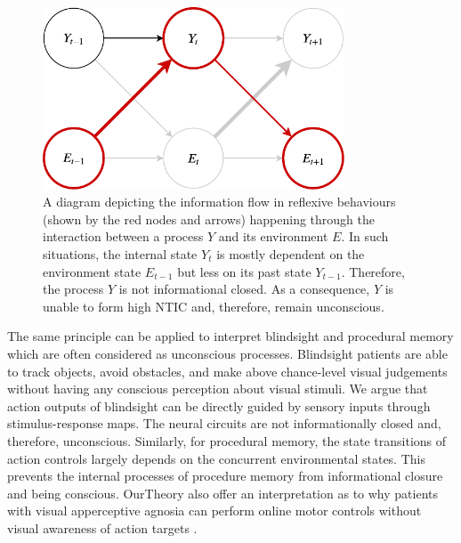 \documentclass[utf8]{article}
\begin{document}
        		\begin{figure}[H]
        			\includegraphics[width=0.8\textwidth]{WritingMaterials/Fig_Reflexive/Reflexive.pdf}
        			\caption{
        			    A diagram depicting the information flow in reflexive behaviours (shown by the red nodes and arrows) happening through the interaction between a process $Y$ and its environment $E$. In such situations, the internal state $Y_t$ is mostly dependent on the environment state $E_{t-1}$ but less on its past state $Y_{t-1}$. Therefore, the process $Y$ is not informational closed. As a  consequence, $Y$ is unable to form high NTIC and, therefore, remain unconscious. 
        			    }
        			\label{fig:reflexive}
        		\end{figure}  
        		
        		The same principle can be applied to interpret blindsight \citep{humphrey1999history, humphrey1974vision, Humphrey1970} and procedural memory \citep{doyon2009contributions, ashby2010cortical} which are often considered as unconscious processes. Blindsight patients are able to track objects, avoid obstacles, and make above chance-level visual judgements without having any conscious perception about visual stimuli. We argue that action outputs of blindsight can be directly guided by sensory inputs through stimulus-response maps. The neural circuits are not informationally closed and, therefore, unconscious. Similarly, for procedural memory, the state transitions of action controls largely depends on the concurrent environmental states. This prevents the internal processes of procedure memory from informational closure and being conscious. \ac{OurTheory} also offer an interpretation as to why patients with visual apperceptive agnosia \citep{james2003ventral} can perform online motor controls without visual awareness of action targets \citep{10.3389/fneur.2014.00255}. 
\end{document}

